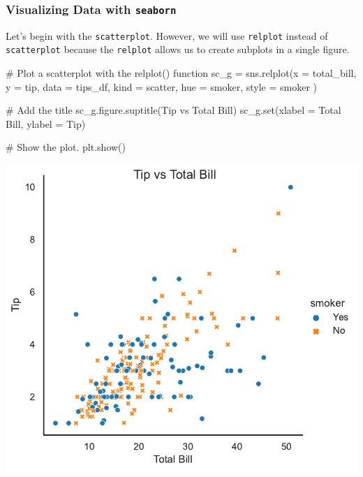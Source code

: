 \documentclass[
  letterpaper,
  DIV=11,
  numbers=noendperiod]{scrartcl}
\newenvironment{Shaded}{\begin{snugshade}}{\end{snugshade}}
\newcommand{\BuiltInTok}[1]{\textcolor[rgb]{0.00,0.46,0.62}{#1}}
\newcommand{\CommentTok}[1]{\textcolor[rgb]{0.37,0.37,0.37}{#1}}
\newcommand{\NormalTok}[1]{\textcolor[rgb]{0.00,0.46,0.62}{#1}}
\newcommand{\OperatorTok}[1]{\textcolor[rgb]{0.37,0.37,0.37}{#1}}
\newcommand{\StringTok}[1]{\textcolor[rgb]{0.13,0.47,0.30}{#1}}
\begin{document}
\hypertarget{visualizing-data-with-seaborn}{%
\subsubsection{\texorpdfstring{Visualizing Data with
\texttt{seaborn}}{Visualizing Data with seaborn}}\label{visualizing-data-with-seaborn}}

Let's begin with the \texttt{scatterplot}. However, we will use
\texttt{relplot} instead of \texttt{scatterplot} because the
\texttt{relplot} allows us to create subplots in a single figure.

\begin{Shaded}
\begin{Highlighting}[]
\CommentTok{\# Plot a scatterplot with the relplot() function}
\NormalTok{sc\_g }\OperatorTok{=}\NormalTok{ sns.relplot(x }\OperatorTok{=} \StringTok{\textquotesingle{}total\_bill\textquotesingle{}}\NormalTok{, }
\NormalTok{            y }\OperatorTok{=} \StringTok{\textquotesingle{}tip\textquotesingle{}}\NormalTok{,}
\NormalTok{            data }\OperatorTok{=}\NormalTok{ tips\_df,}
\NormalTok{            kind }\OperatorTok{=} \StringTok{\textquotesingle{}scatter\textquotesingle{}}\NormalTok{,}
\NormalTok{            hue }\OperatorTok{=} \StringTok{\textquotesingle{}smoker\textquotesingle{}}\NormalTok{,}
\NormalTok{            style }\OperatorTok{=} \StringTok{\textquotesingle{}smoker\textquotesingle{}}
\NormalTok{          )}
 
\CommentTok{\# Add the title}
\NormalTok{sc\_g.figure.suptitle(}\StringTok{\textquotesingle{}Tip vs Total Bill\textquotesingle{}}\NormalTok{)}
\NormalTok{sc\_g.}\BuiltInTok{set}\NormalTok{(xlabel }\OperatorTok{=} \StringTok{\textquotesingle{}Total Bill\textquotesingle{}}\NormalTok{,}
\NormalTok{         ylabel }\OperatorTok{=} \StringTok{\textquotesingle{}Tip\textquotesingle{}}\NormalTok{)}
         
\CommentTok{\# Show the plot.}
\NormalTok{plt.show()}
\end{Highlighting}
\end{Shaded}

\includegraphics{data_visualization_with_seaborn_files/figure-pdf/cell-11-output-1.pdf}
\end{document}
